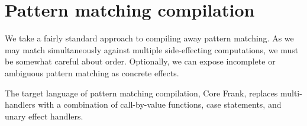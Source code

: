 \documentclass[preprint]{sigplanconf}
\newcommand{\lameff}{$\lambda_\mathrm{eff}$\xspace}
\newcommand{\feff}{$F_\textrm{eff}$\xspace}
\newcommand{\impeff}{Implicit \lameff}
\begin{document}






\section{Pattern matching compilation}
\label{sec:core}

We take a fairly standard approach to compiling away pattern
matching. As we may match simultaneously against multiple
side-effecting computations, we must be somewhat careful about
order. Optionally, we can expose incomplete or ambiguous pattern
matching as concrete effects.

The target language of pattern matching compilation, Core Frank,
replaces multi-handlers with a combination of call-by-value functions,
case statements, and unary effect handlers.
\end{document}
